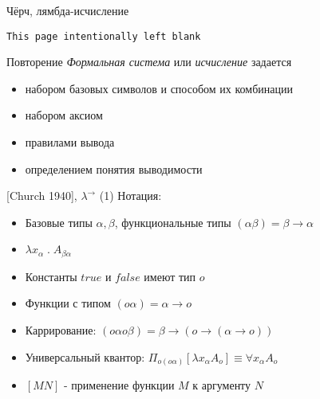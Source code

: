 \documentclass{beamer}
\begin{document}
\begin{frame}{Чёрч, лямбда-исчисление}
\begin{center}
\texttt{This page intentionally left blank}
\end{center}
\end{frame}

\begin{frame}{Повторение}
\textit{Формальная система} или \textit{исчисление} задается\\
\begin{itemize}
  \item набором базовых символов и способом их комбинации
  \item набором аксиом
  \item правилами вывода
  \item определением понятия выводимости
\end{itemize}
\bigskip

\end{frame}

\begin{frame}{[Church 1940], $\lambda^\to$ (1)}
Нотация:\\
\bigskip
\begin{itemize}
  \item Базовые типы $\alpha, \beta$, функциональные типы $(\alpha\beta) = \beta \to \alpha$
  \item $\lambda x_\alpha \; . \; A_{\beta\alpha}$
  \item Константы $true$ и $false$ имеют тип $o$
  \item Функции с типом $(o\alpha) = \alpha \to o$
  \item Каррирование: $(o\alpha o\beta) = \beta \to (o \to (\alpha \to o))$
  \item Универсальный квантор: $\Pi_{o(o\alpha)}[\lambda x_\alpha A_o] \equiv \forall x_\alpha A_o$
  \item $[MN]$ - применение функции $M$ к аргументу $N$
\end{itemize}
\end{frame}
\end{document}

